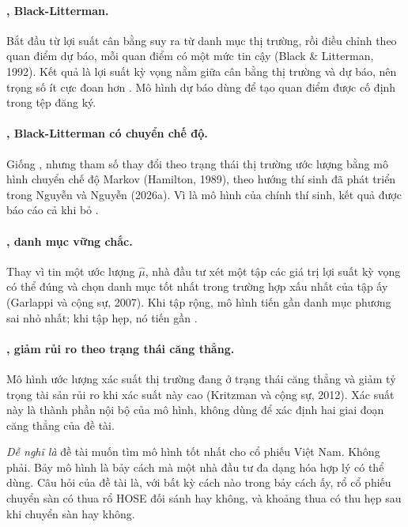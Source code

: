 \paragraph{, Black-Litterman.} Bắt đầu từ lợi suất cân bằng suy ra từ danh mục thị trường, rồi điều chỉnh theo quan điểm dự báo, mỗi quan điểm có một mức tin cậy (Black \& Litterman, 1992). Kết quả là lợi suất kỳ vọng nằm giữa cân bằng thị trường và dự báo, nên trọng số ít cực đoan hơn . Mô hình dự báo dùng để tạo quan điểm được cố định trong tệp đăng ký.

\paragraph{, Black-Litterman có chuyển chế độ.} Giống , nhưng tham số thay đổi theo trạng thái thị trường ước lượng bằng mô hình chuyển chế độ Markov (Hamilton, 1989), theo hướng thí sinh đã phát triển trong Nguyễn và Nguyễn (2026a). Vì là mô hình của chính thí sinh, kết quả được báo cáo cả khi bỏ .

\paragraph{, danh mục vững chắc.} Thay vì tin một ước lượng $\hat{\mu}$, nhà đầu tư xét một tập các giá trị lợi suất kỳ vọng có thể đúng và chọn danh mục tốt nhất trong trường hợp xấu nhất của tập ấy (Garlappi và cộng sự, 2007). Khi tập rộng, mô hình tiến gần danh mục phương sai nhỏ nhất; khi tập hẹp, nó tiến gần .

\paragraph{, giảm rủi ro theo trạng thái căng thẳng.} Mô hình ước lượng xác suất thị trường đang ở trạng thái căng thẳng và giảm tỷ trọng tài sản rủi ro khi xác suất này cao (Kritzman và cộng sự, 2012). Xác suất này là thành phần nội bộ của mô hình, không dùng để xác định hai giai đoạn căng thẳng của đề tài.

\begin{delam}
\emph{Dễ nghĩ là} đề tài muốn tìm mô hình tốt nhất cho cổ phiếu Việt Nam. Không phải. Bảy mô hình là bảy cách mà một nhà đầu tư đa dạng hóa hợp lý có thể dùng. Câu hỏi của đề tài là, với bất kỳ cách nào trong bảy cách ấy, rổ cổ phiếu chuyển sàn có thua rổ HOSE đối sánh hay không, và khoảng thua có thu hẹp sau khi chuyển sàn hay không.
\end{delam}


